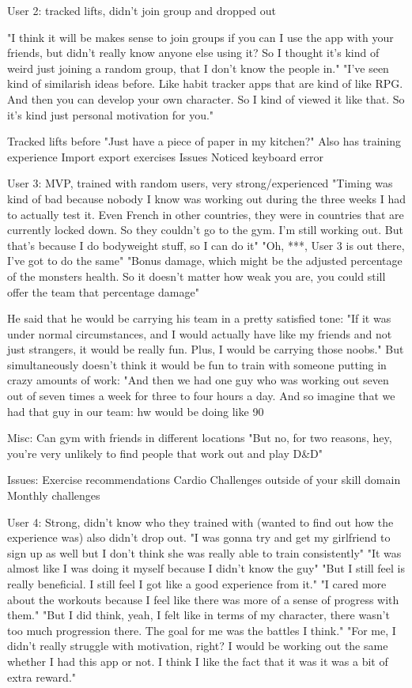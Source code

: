 \documentclass{l4proj}
\begin{document}
User 2: tracked lifts, didn't join group and dropped out
  
  "I think it will be makes sense to join groups if you can I use the app with your friends, but didn't really know anyone else using it? So I thought it's kind of weird just joining a random group, that I don't know the people in."
  "I've seen kind of similarish ideas before. Like habit tracker apps that are kind of like RPG. And then you can develop your own character. So I kind of viewed it like that. So it's kind just personal motivation for you."

  Tracked lifts before "Just have a piece of paper in my kitchen?" Also has training experience
  Import export exercises
  Issues
    Noticed keyboard error





User 3: MVP, trained with random users, very strong/experienced
  "Timing was kind of bad because nobody I know was working out during the three weeks I had to actually test it. Even French in other countries, they were in countries that are currently locked down. So they couldn't go to the gym. I'm still working out. But that's because I do bodyweight stuff, so I can do it"
  "Oh, ***, User 3 is out there, I've got to do the same"
   "Bonus damage, which might be the adjusted percentage of the monsters health. So it doesn't matter how weak you are, you could still offer the team that percentage damage"

  He said that he would be carrying his team in a pretty satisfied tone: "If it was under normal circumstances, and I would actually have like my friends and not just strangers, it would be really fun. Plus, I would be carrying those noobs." 
  But simultaneously doesn't think it would be fun to train with someone putting in crazy amounts of work:
  "And then we had one guy who was working out seven out of seven times a week for three to four hours a day. And so imagine that we had that guy in our team: hw would be doing like 90%

  Misc: 
    Can gym with friends in different locations
    "But no, for two reasons, hey, you're very unlikely to find people that work out and play D\&D"

  Issues:
    Exercise recommendations
    Cardio
    Challenges outside of your skill domain
    Monthly challenges

User 4: Strong, didn't know who they trained with (wanted to find out how the experience was) also didn't drop out. 
  "I was gonna try and get my girlfriend to sign up as well but I don't think she was really able to train consistently"
  "It was almost like I was doing it myself because I didn't know the guy" 
  "But I still feel is really beneficial. I still feel I got like a good experience from it."
  "I cared more about the workouts because I feel like there was more of a sense of progress with them."
  "But I did think, yeah, I felt like in terms of my character, there wasn't too much progression there. The goal for me was the battles I think." 
  "For me, I didn't really struggle with motivation, right? I would be working out the same whether I had this app or not. I think I like the fact that it was it was a bit of extra reward."
\end{document}

